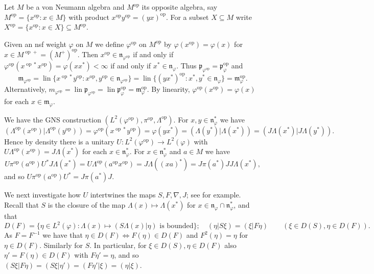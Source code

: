 \documentclass[a4paper,11pt]{article}
\theoremstyle{plain}
\theoremstyle{remark}
\newcommand{\mf}[1]{\mathfrak{#1}}
\newcommand{\lin}{\operatorname{lin}}
\newcommand{\op}{{\operatorname{op}}}
\begin{document}
Let $M$ be a von Neumann algebra and $M^\op$ its opposite algebra, say $M^\op = \{ x^\op : x\in M \}$ with product $x^\op y^\op = (yx)^\op$.  For a subset $X\subseteq M$ write $X^\op = \{ x^\op : x\in X \} \subseteq M^\op$.

Given an nsf weight $\varphi$ on $M$ we define $\varphi^\op$ on $M^\op$ by $\varphi(x^\op) = \varphi(x)$ for $x\in M^{\op +} = (M^+)^\op$.  Then $x^\op\in\mf n_{\varphi^\op}$ if and only if $\varphi^\op(x^{\op *} x^\op) = \varphi(xx^*) < \infty$ if and only if $x^*\in\mf n_\varphi$.  Thus $\mf p_{\varphi^\op} = \mf p_\varphi^\op$ and
\[ \mf m_{\varphi^\op} = \lin \{ x^{\op *} y^\op : x^\op, y^\op \in \mf n_{\varphi^\op} \}
= \lin\{ (yx^*)^\op : x^*, y^* \in \mf n_\varphi \} = \mf m_\varphi^\op. \]
Alternatively, $m_{\varphi^\op} = \lin \mf p_{\varphi^\op} = \lin \mf p_\varphi^\op = \mf m_\varphi^\op$.  By linearity, $\varphi^\op(x^\op) = \varphi(x)$ for each $x\in\mf m_\varphi$.

We have the GNS construction $(L^2(\varphi^\op), \pi^\op, \Lambda^\op)$.  For $x,y\in \mf n_\varphi^*$ we have 
\[ ( \Lambda^\op(x^\op) | \Lambda^\op(y^\op) )
= \varphi^\op(x^{\op *} y^\op)
= \varphi(yx^*)
= (\Lambda(y^*)|\Lambda(x^*))
= (J\Lambda(x^*) | J\Lambda(y^*)). \]
Hence by density there is a unitary $U\colon L^2(\varphi^\op) \to L^2(\varphi)$ with $U\Lambda^\op(x^\op) = J\Lambda(x^*)$ for each $x\in\mf n_\varphi^*$.  For $x\in\mf n_\varphi^*$ and $a\in M$ we have
\[ U \pi^\op(a^\op) U^* J\Lambda(x^*) = U \Lambda^\op(a^\op x^\op)
= J\Lambda((xa)^*) = J \pi(a^*) JJ \Lambda(x^*), \]
and so $U \pi^\op(a^\op) U^* = J \pi(a^*) J$.

We next investigate how $U$ intertwines the maps $S, F, \nabla, J$; see \cite[Lemma~VI.1.5]{TakesakiII} for example.  Recall that $S$ is the closure of the map $\Lambda(x) \mapsto \Lambda(x^*)$ for $x\in\mf n_\varphi\cap\mf n_\varphi^*$, and that
\[ D(F) = \{ \eta\in L^2(\varphi) : \Lambda(x) \mapsto (S\Lambda(x)|\eta) \text{ is bounded} \}; \quad (\eta|S\xi) = (\xi|F\eta) \qquad (\xi\in D(S), \eta\in D(F)). \]
As $F = F^{-1}$ we have that $\eta\in D(F) \Leftrightarrow F(\eta)\in D(F)$ and $F^2(\eta) = \eta$ for $\eta\in D(F)$.  Similarly for $S$.  In particular, for $\xi\in D(S), \eta\in D(F)$ also $\eta'=F(\eta)\in D(F)$ with $F\eta'=\eta$, and so $(S\xi|F\eta) = (S\xi|\eta') = (F\eta'|\xi) = (\eta|\xi)$.
\end{document}
